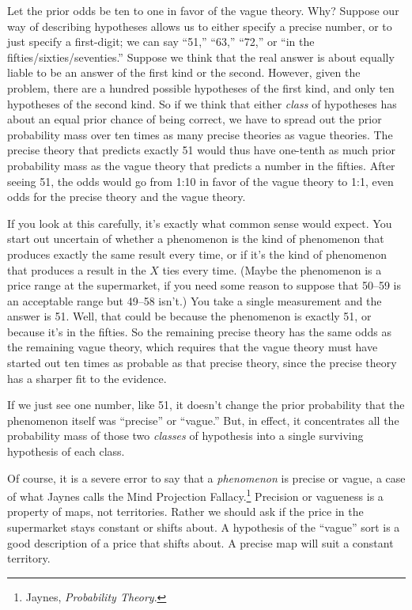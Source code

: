 {
 Let the prior odds be ten to one in favor of the vague theory.
Why? Suppose our way of describing hypotheses allows us to either
specify a precise number, or to just specify a first-digit; we can say
``51,''
``63,''
``72,'' or ``in the
fifties/sixties/seventies.'' Suppose we think that
the real answer is about equally liable to be an answer of the first
kind or the second. However, given the problem, there are a hundred
possible hypotheses of the first kind, and only ten hypotheses of the
second kind. So if we think that either \textit{class} of hypotheses
has about an equal prior chance of being correct, we have to spread out
the prior probability mass over ten times as many precise theories as
vague theories. The precise theory that predicts exactly 51 would thus
have one-tenth as much prior probability mass as the vague theory that
predicts a number in the fifties. After seeing 51, the odds would go
from 1:10 in favor of the vague theory to 1:1, even odds for the
precise theory and the vague theory.}

{
 If you look at this carefully, it's exactly what
common sense would expect. You start out uncertain of whether a
phenomenon is the kind of phenomenon that produces exactly the same
result every time, or if it's the kind of phenomenon
that produces a result in the $X$ ties every time. (Maybe the phenomenon
is a price range at the supermarket, if you need some reason to suppose
that 50--59 is an acceptable range but 49--58 isn't.)
You take a single measurement and the answer is 51. Well, that could be
because the phenomenon is exactly 51, or because it's
in the fifties. So the remaining precise theory has the same odds as
the remaining vague theory, which requires that the vague theory must
have started out ten times as probable as that precise theory, since
the precise theory has a sharper fit to the evidence.}

{
 If we just see one number, like 51, it doesn't
change the prior probability that the phenomenon itself was
``precise'' or
``vague.'' But, in effect, it
concentrates all the probability mass of those two \textit{classes} of
hypothesis into a single surviving hypothesis of each class.}

{
 Of course, it is a severe error to say that a \textit{phenomenon}
is precise or vague, a case of what Jaynes calls the Mind Projection
Fallacy.\footnote{Jaynes, \textit{Probability Theory}.} Precision or vagueness is a property of
maps, not territories. Rather we should ask if the price in the
supermarket stays constant or shifts about. A hypothesis of the
``vague'' sort is a good description
of a price that shifts about. A precise map will suit a constant
territory.}

